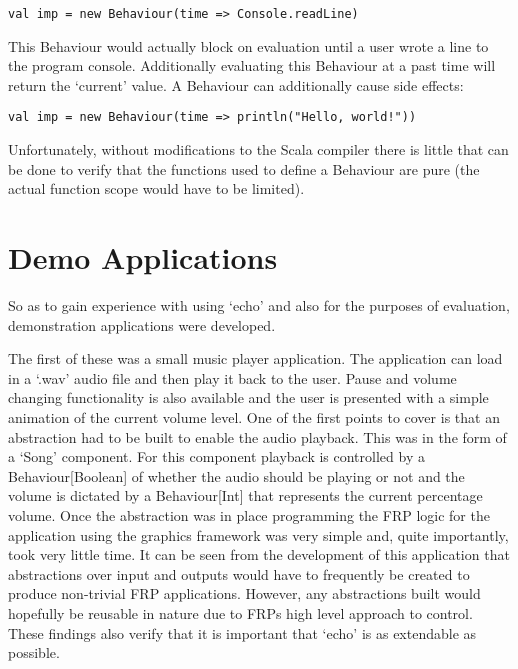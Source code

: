 \begin{verbatim}
val imp = new Behaviour(time => Console.readLine)
\end{verbatim}    

    This Behaviour would actually block on evaluation until a user wrote a line to the program console. 
    Additionally evaluating this Behaviour at a past time will return the `current' value. A
    Behaviour can additionally cause side effects:

\begin{verbatim}    
val imp = new Behaviour(time => println("Hello, world!"))
\end{verbatim}

    Unfortunately, without modifications to the Scala compiler there is little that can be done
    to verify that the functions used to define a Behaviour are pure (the actual function scope would
    have to be limited).
  
  \section{Demo Applications}
    So as to gain experience with using `echo' and also for the purposes of evaluation, demonstration
    applications were developed. 
    
    The first of these was a small music player application. The application
    can load in a `.wav' audio file and then play it back to the user. Pause and volume changing functionality
    is also available and the user is presented with a simple animation of the current volume level. One of the
    first points to cover is that an abstraction had to be built to enable the audio playback. This was in the form
    of a `Song' component. For this component playback is controlled by a Behaviour[Boolean] of whether the audio
    should be playing or not and the volume is dictated by a Behaviour[Int] that represents the current percentage
    volume. Once the abstraction was in place programming the FRP logic for the application using the 
    graphics framework was very simple and, quite importantly, took very little time. It can be seen from
    the development of this application that abstractions over input and outputs would have to frequently be
    created to produce non-trivial FRP applications. However, any abstractions built would hopefully be
    reusable in nature due to FRPs high level approach to control. These findings also verify that it
    is important that `echo' is as extendable as possible.